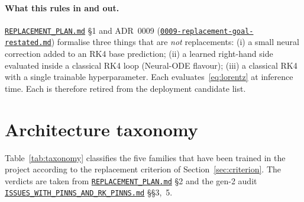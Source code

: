 \documentclass[11pt,a4paper]{article}
\begin{document}
\paragraph{What this rules in and out.}
\href{run:../../experiments/gen_3/REPLACEMENT_PLAN.md}{\texttt{REPLACEMENT\_PLAN.md}}
§1 and ADR~0009
(\href{run:../../experiments/gen_3/For_Allen/docs/decisions/0009-replacement-goal-restated.md}{\texttt{0009-replacement-goal-restated.md}})
formalise three things that are \emph{not} replacements: (i) a small neural
correction added to an RK4 base prediction; (ii) a learned right-hand side
evaluated inside a classical RK4 loop (Neural-ODE flavour); (iii) a classical
RK4 with a single trainable hyperparameter. Each evaluates~\eqref{eq:lorentz}
at inference time. Each is therefore retired from the deployment candidate
list.

\section{Architecture taxonomy}\label{sec:taxonomy}

Table~\ref{tab:taxonomy} classifies the five families that have been trained
in the project according to the replacement criterion of
Section~\ref{sec:criterion}. The verdicts are taken from
\href{run:../../experiments/gen_3/REPLACEMENT_PLAN.md}{\texttt{REPLACEMENT\_PLAN.md}}
§2 and the gen-2 audit
\href{run:../../experiments/gen_2/ISSUES_WITH_PINNS_AND_RK_PINNS.md}{\texttt{ISSUES\_WITH\_PINNS\_AND\_RK\_PINNS.md}}
§§3,~5.
\end{document}
